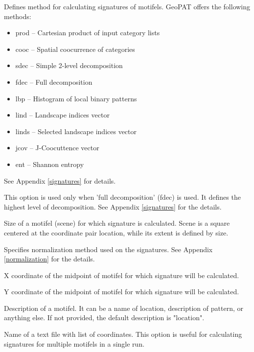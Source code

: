Defines method for calculating signatures of motifels.
GeoPAT offers the following methods: 
\begin{itemize}
	\item prod -- Cartesian product of input category lists
	\item cooc -- Spatial coocurrence of categories
	\item sdec -- Simple 2-level decomposition
	\item fdec -- Full decomposition
	\item lbp -- Histogram of local binary patterns
	\item lind -- Landscape indices vector
	\item linds -- Selected landscape indices vector
	\item jcov -- J-Coocuttence vector
	\item ent -- Shannon entropy
\end{itemize}
See Appendix \ref{signatures} for details.


This option is used only when 'full decomposition' (fdec) is used.
It defines the highest level of decomposition.
See Appendix \ref{signatures} for the details.


Size of a motifel (scene) for which signature is calculated.
Scene is a square centered at the coordinate pair location, while its extent is defined by size. 


Specifies normalization method used on the signatures. 
See Appendix \ref{normalization} for the details.


X coordinate of the midpoint of motifel for which signature will be calculated.


Y coordinate of the midpoint of motifel for which signature will be calculated.


Description of a motifel.
It can be a name of location, description of pattern, or anything else. 
If not provided, the default description is "location".


Name of a text file with list of coordinates. 
This option is useful for calculating signatures for multiple motifels in a single run. 

